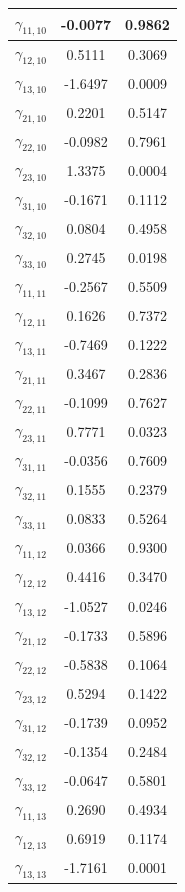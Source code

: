 \documentclass[a4paper, 12pt, openany, oneside, brazil]{abntex2}
\begin{document}
\begin{apendicesenv}
\begin{longtable}{|c|c|c|}
	\hline
	$\gamma_{11,10}$ & -0.0077 & 0.9862 \\
	\hline
	$\gamma_{12,10}$ & 0.5111 & 0.3069 \\
	\hline
	$\gamma_{13,10}$ & -1.6497 & 0.0009 \\
	\hline
	$\gamma_{21,10}$ & 0.2201 & 0.5147 \\
	\hline
	$\gamma_{22,10}$ & -0.0982 & 0.7961 \\
	\hline
	$\gamma_{23,10}$ & 1.3375 & 0.0004 \\
	\hline
	$\gamma_{31,10}$ & -0.1671 & 0.1112 \\
	\hline
	$\gamma_{32,10}$ & 0.0804 & 0.4958 \\
	\hline
	$\gamma_{33,10}$ & 0.2745 & 0.0198 \\
	\hline
	$\gamma_{11,11}$ & -0.2567 & 0.5509 \\
	\hline
	$\gamma_{12,11}$ & 0.1626 & 0.7372 \\
	\hline
	$\gamma_{13,11}$ & -0.7469 & 0.1222 \\
	\hline
	$\gamma_{21,11}$ & 0.3467 & 0.2836 \\
	\hline
	$\gamma_{22,11}$ & -0.1099 & 0.7627 \\
	\hline
	$\gamma_{23,11}$ & 0.7771 & 0.0323 \\
	\hline
	$\gamma_{31,11}$ & -0.0356 & 0.7609 \\
	\hline
	$\gamma_{32,11}$ & 0.1555 & 0.2379 \\
	\hline
	$\gamma_{33,11}$ & 0.0833 & 0.5264 \\
	\hline
	$\gamma_{11,12}$ & 0.0366 & 0.9300 \\
	\hline
	$\gamma_{12,12}$ & 0.4416 & 0.3470 \\
	\hline
	$\gamma_{13,12}$ & -1.0527 & 0.0246 \\
	\hline
	$\gamma_{21,12}$ & -0.1733 & 0.5896 \\
	\hline
	$\gamma_{22,12}$ & -0.5838 & 0.1064 \\
	\hline
	$\gamma_{23,12}$ & 0.5294 & 0.1422 \\
	\hline
	$\gamma_{31,12}$ & -0.1739 & 0.0952 \\
	\hline
	$\gamma_{32,12}$ & -0.1354 & 0.2484 \\
	\hline
	$\gamma_{33,12}$ & -0.0647 & 0.5801 \\
	\hline
	$\gamma_{11,13}$ & 0.2690 & 0.4934 \\
	\hline
	$\gamma_{12,13}$ & 0.6919 & 0.1174 \\
	\hline
	$\gamma_{13,13}$ & -1.7161 & 0.0001 \\

\end{longtable}
\end{apendicesenv}
\end{document}
